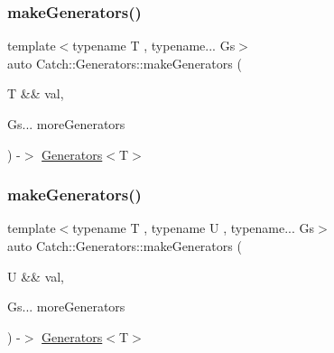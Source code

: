 \mbox{\label{namespace_catch_1_1_generators_a0497b4463b7afee28df49631d6d75e83}} 
\subsubsection{\texorpdfstring{make\+Generators()}{makeGenerators()}\hspace{0.1cm}{\footnotesize\ttfamily [3/4]}}
{\footnotesize\ttfamily template$<$typename T , typename... Gs$>$ \\
auto Catch\+::\+Generators\+::make\+Generators (\begin{DoxyParamCaption}\item[{T \&\&}]{val,  }\item[{Gs...}]{more\+Generators }\end{DoxyParamCaption}) -\/$>$ \mbox{\hyperlink{struct_catch_1_1_generators_1_1_generators}{Generators}}$<$T$>$ }

\mbox{\label{namespace_catch_1_1_generators_a82a76355ef148099d60ca9c67a986104}} 
\subsubsection{\texorpdfstring{make\+Generators()}{makeGenerators()}\hspace{0.1cm}{\footnotesize\ttfamily [4/4]}}
{\footnotesize\ttfamily template$<$typename T , typename U , typename... Gs$>$ \\
auto Catch\+::\+Generators\+::make\+Generators (\begin{DoxyParamCaption}\item[{U \&\&}]{val,  }\item[{Gs...}]{more\+Generators }\end{DoxyParamCaption}) -\/$>$ \mbox{\hyperlink{struct_catch_1_1_generators_1_1_generators}{Generators}}$<$T$>$ }

\mbox{\label{namespace_catch_1_1_generators_a13afd4c586149e2c76bfb26396cb4b96}} 
